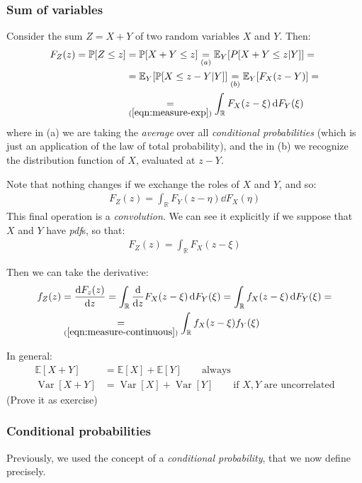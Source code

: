 \documentclass[../template.tex]{subfiles}
\begin{document}
\subsubsection{Sum of variables}
Consider the sum $Z=X+Y$ of two random variables $X$ and $Y$. Then:
\begin{align*}
   F_Z(z) = \mathbb{P}[Z \leq z] &= \mathbb{P}[X+Y \leq z] \underset{(a)}{=}  \mathbb{E}_Y[P[X+Y \leq z|Y]] =\\
    &= \mathbb{E}_Y [\mathbb{P}[X \leq z- Y| Y]] \underset{(b)}{=}  \mathbb{E}_Y[F_X(z-Y)] = \\
    &\underset{(\ref{eqn:measure-exp})}{=}  \int_{\mathbb{R}} F_X(z-\xi) \dd{F_Y(\xi)}
\end{align*}
where in (a) we are taking the \textit{average} over all \textit{conditional probabilities} (which is just an application of the law of total probability), and the in (b) we recognize the distribution function of $X$, evaluated at $z-Y$.

\medskip

Note that nothing changes if we exchange the roles of $X$ and $Y$, and so:
\begin{align*}
    F_Z(z) = \int_{\mathbb{R}} F_Y(z-\eta) \dd{F_X}(\eta)
\end{align*}
This final operation is a \textit{convolution}. We can see it explicitly if we suppose that $X$ and $Y$ have \textit{pdf}s, so that:
\begin{align*}
    F_Z(z) = \int_{\mathbb{R}} F_X(z- \xi)
\end{align*}

Then we can take the derivative:
\begin{align*}
    f_Z(z) &= \dv{F_z(z)}{z} = \int_{\mathbb{R}} \dv{z} F_X(z-\xi) \dd{F_Y(\xi)} = \int_{\mathbb{R}} f_X(z- \xi) \dd{F_Y(\xi)} =\\
    &\underset{(\ref{eqn:measure-continuous})}{=} \int_{\mathbb{R}} f_X(z- \xi) f_Y(\xi)
\end{align*}  

In general:
\begin{align*}
    \mathbb{E}[X+Y] &= \mathbb{E}[X] + \mathbb{E}[Y] \qquad \text{always}\\
    \operatorname{Var}[X+Y] &= \operatorname{Var}[X] + \operatorname{Var}[Y] \qquad \text{if $X,Y$ are uncorrelated}   
\end{align*}
(Prove it as exercise)

\subsubsection{Conditional probabilities}
Previously, we used the concept of a \textit{conditional probability}, that we now define precisely.
\end{document}
